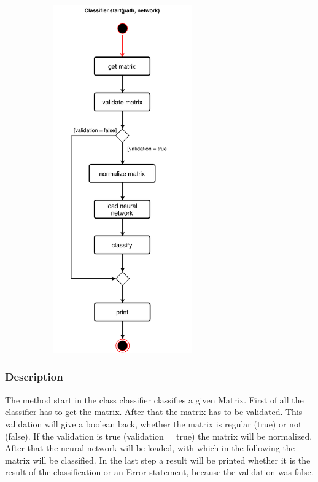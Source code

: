 \documentclass[parskip=full]{scrartcl}
\begin{document}
\begin{figure}[h]
\begin{center}
\includegraphics[width=8cm,height=15cm,keepaspectratio]{ActivityDiagrams/PDF/classification}
%
\label{Activity Diagrams}
\end{center}
\end{figure}

\newpage
\subsubsection{Description}
The method start in the class classifier classifies a given Matrix.
First of all the classifier has to get the matrix. 
After that the matrix has to be validated.
This validation will give a boolean back, whether the matrix is regular (true) or not (false).
If the validation is true (validation = true) the matrix will be normalized.
After that the neural network will be loaded, with which in the following the matrix will be classified.
In the last step a result will be printed whether it is the result of the classification or an Error-statement, because the validation was false.
\end{document}
